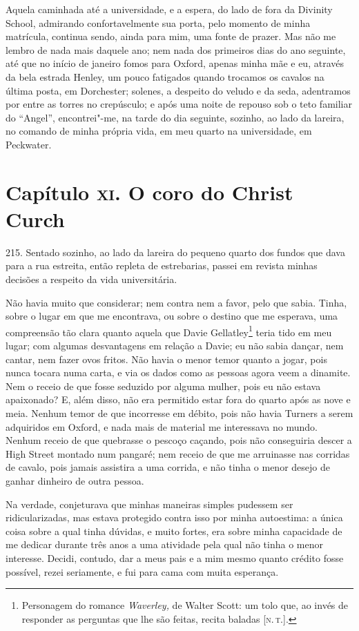 Aquela caminhada até a universidade, e a espera, do lado de fora da
Divinity School, admirando confortavelmente sua porta, pelo momento de
minha matrícula, continua sendo, ainda para mim, uma fonte de prazer.
Mas não me lembro de nada mais daquele ano; nem nada dos primeiros dias
do ano seguinte, até que no início de janeiro fomos para Oxford, apenas
minha mãe e eu, através da bela estrada Henley, um pouco fatigados
quando trocamos os cavalos na última posta, em Dorchester; solenes, a
despeito do veludo e da seda, adentramos por entre as torres no
crepúsculo; e após uma noite de repouso sob o teto familiar do
``Angel'', encontrei"-me, na tarde do dia seguinte, sozinho, ao lado da
lareira, no comando de minha própria vida, em meu quarto na
universidade, em Peckwater.

\chapter{Capítulo \textsc{xi}. O coro do Christ Curch}

215. Sentado sozinho, ao lado da lareira do pequeno quarto dos fundos
que dava para a rua estreita, então repleta de estrebarias, passei em
revista minhas decisões a respeito da vida universitária.

Não havia muito que considerar; nem contra nem a favor, pelo que sabia.
Tinha, sobre o lugar em que me encontrava, ou sobre o destino que me
esperava, uma compreensão tão clara quanto aquela que Davie
Gellatley\footnote{Personagem do romance \emph{Waverley,} de Walter
  Scott: um tolo que, ao invés de responder as perguntas que lhe são
  feitas, recita baladas {[}\textsc{n.\,t.}{]}.} teria tido em meu lugar; com
algumas desvantagens em relação a Davie; eu não sabia dançar, nem
cantar, nem fazer ovos fritos. Não havia o menor temor quanto a jogar,
pois nunca tocara numa carta, e via os dados como as pessoas agora veem
a dinamite. Nem o receio de que fosse seduzido por alguma mulher, pois
eu não estava apaixonado? E, além disso, não era permitido estar fora do
quarto após as nove e meia. Nenhum temor de que incorresse em débito,
pois não havia Turners a serem adquiridos em Oxford, e nada mais de
material me interessava no mundo. Nenhum receio de que quebrasse o
pescoço caçando, pois não conseguiria descer a High Street montado num
pangaré; nem receio de que me arruinasse nas corridas de cavalo, pois
jamais assistira a uma corrida, e não tinha o menor desejo de ganhar
dinheiro de outra pessoa.

Na verdade, conjeturava que minhas maneiras simples pudessem ser
ridicularizadas, mas estava protegido contra isso por minha autoestima:
a única coisa sobre a qual tinha dúvidas, e muito fortes, era sobre
minha capacidade de me dedicar durante três anos a uma atividade pela
qual não tinha o menor interesse. Decidi, contudo, dar a meus pais e a
mim mesmo quanto crédito fosse possível, rezei seriamente, e fui para
cama com muita esperança.

